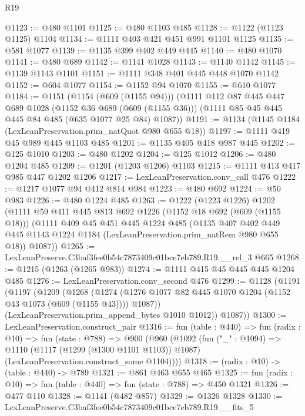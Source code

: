 \begin{lexlean}{R19}
\begin{coremodule}
@1123 := @480 @1101
@1125 := @480 @1103 @485
@1128 := @1122 (@1123 @1125) @1104
@1134 := @1111 @403 @421 @451 @991 @1101 @1125
@1135 := @581 @1077
@1139 := @1135 @399 @402 @449 @445
@1140 := @480 @1070
@1141 := @480 @689
@1142 := @1141 @1028
@1143 := @1140 @1142
@1145 := @1139 @1143 @1101
@1151 := @1111 @348 @401 @445 @448 @1070 @1142
@1152 := @604 @1077
@1154 := @1152 @94 @1070
@1155 := @610 @1077
@1184 := @1151
    (@1154 (@609 (@1155 @94)))
    (@1111
      @112
      @87
      @445
      @447
      @689
      @1028
      (@1152 @36 @689 (@609 (@1155 @36)))
      (@1111 @85 @45 @445 @445 @84 @485 (@635 @1077 @25 @84) @1087))
@1191 := @1134 (@1145 @1184 (LexLeanPreservation.prim_natQuot @980 @655 @18))
@1197 := @1111 @419 @45 @989 @445 @1103 @485
@1201 := @1135 @405 @418 @987 @445
@1202 := @125 @1010
@1203 := @480 @1202
@1204 := @125 @1012
@1206 := @480 @1204 @485
@1209 := @1201 (@1203 @1206) @1103
@1215 := @1111 @413 @417 @985 @447 @1202 @1206
@1217 := LexLeanPreservation.conv_call @476
@1222 := @1217 @1077 @94 @412 @814 @984
@1223 := @480 @692
@1224 := @50 @983
@1226 := @480 @1224 @485
@1263 := @1222
    (@1223 @1226)
    @1202
    (@1111
      @59
      @411
      @445
      @813
      @692
      @1226
      (@1152 @18 @692 (@609 (@1155 @18)))
      (@1111
        @409
        @45
        @451
        @445
        @1224
        @485
        (@1135
          @407
          @402
          @449
          @445
          @1143
          @1224
          @1184
          (LexLeanPreservation.prim_natRem @980 @655 @18))
        @1087))
@1265 := LexLeanPreserve.C3baf3fee0b54c7873409c01bce7eb789.R19.__rel_3 @665
@1268 := @1215 (@1263 (@1265 @983))
@1274 := @1111 @415 @45 @445 @445 @1204 @485
@1276 := LexLeanPreservation.conv_second @476
@1299 := @1128
    (@1191
      (@1197
        (@1209
          (@1268
            (@1274 (@1276 @1077 @82 @445 @1070 @1204 (@1152 @43 @1073 (@609 (@1155 @43)))) @1087))
          (LexLeanPreservation.prim_append_bytes @1010 @1012))
        @1087))
@1300 := LexLeanPreservation.construct_pair
@1316 := fun (table : @440) =>
  fun (radix : @10) =>
  fun (state : @788) =>
  @900
    (@960
      (@1092
        (fun ("_" : @1094) =>
        @1110
          (@1117 (@1299 (@1300 @1101 @1103)) @1087)
          (LexLeanPreservation.construct_some @1104))))
@1318 := (radix : @10) -> (table : @440) -> @789
@1321 := @861 @463 @655 @465
@1325 := fun (radix : @10) => fun (table : @440) => fun (state : @788) => @450 @1321
@1326 := @477 @110
@1328 := @1141 (@482 @857)
@1329 := @1326 @1328
@1330 := LexLeanPreserve.C3baf3fee0b54c7873409c01bce7eb789.R19.__fits_5

\end{coremodule}
\end{lexlean}
